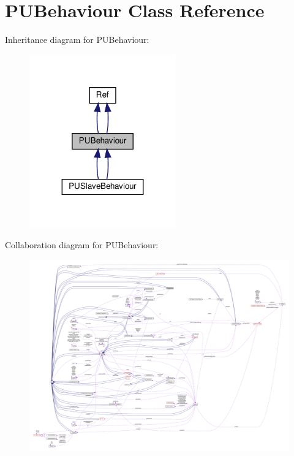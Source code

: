 \hypertarget{classPUBehaviour}{}\section{P\+U\+Behaviour Class Reference}
\label{classPUBehaviour}


Inheritance diagram for P\+U\+Behaviour\+:
\nopagebreak
\begin{figure}[H]
\begin{center}
\leavevmode
\includegraphics[width=179pt]{classPUBehaviour__inherit__graph}
\end{center}
\end{figure}


Collaboration diagram for P\+U\+Behaviour\+:
\nopagebreak
\begin{figure}[H]
\begin{center}
\leavevmode
\includegraphics[width=350pt]{classPUBehaviour__coll__graph}
\end{center}
\end{figure}
